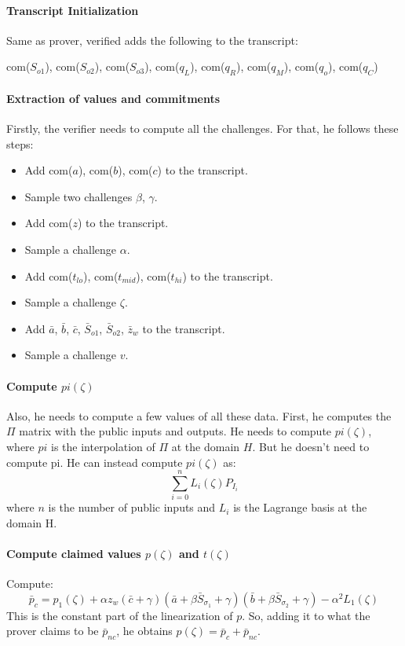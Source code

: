 \documentclass[../lecture-notes.tex]{subfiles}
\begin{document}
\paragraph{Transcript Initialization}

Same as prover, verified adds the following to the transcript:

\begin{center}
com($S_{o1}$), com($S_{o2}$), com($S_{o3}$), com($q_L$), com($q_R$), com($q_M$), com($q_o$), com($q_C$)
\end{center}

\paragraph{Extraction of values and commitments}

Firstly, the verifier needs to compute all the challenges. For that, he follows these steps:
\begin{itemize}
    \item Add com($a$), com($b$), com($c$) to the transcript.
    \item Sample two challenges $\beta$, $\gamma$.
    \item Add com($z$) to the transcript.
    \item Sample a challenge $\alpha$.
    \item Add com($t_{lo}$), com($t_{mid}$), com($t_{hi}$) to the transcript.
    \item Sample a challenge $\zeta$.
    \item Add $\bar{a}$, $\bar{b}$, $\bar{c}$, $\bar{S}_{o1}$, $\bar{S}_{o2}$, $\bar{z}_w$ to the transcript.
    \item Sample a challenge $v$.
\end{itemize}

\paragraph{Compute $pi(\zeta)$}
Also, he needs to compute a few values of all these data. First, he computes the $\Pi$ matrix with the public inputs and outputs. He needs to compute $pi(\zeta)$, where $pi$ is the interpolation of $\Pi$ at the domain $H$. But he doesn't need to compute pi. He can instead compute $pi(\zeta)$ as:
\[\sum_{i=0}^{n} L_{i}(\zeta) P_{I_i}\]
where $n$ is the number of public inputs and $L_i$ is the Lagrange basis at the domain H.

\paragraph{Compute claimed values $p(\zeta)$ and $t(\zeta)$}
Compute: 
\[\bar{p}_c = p_1(\zeta) + \alpha z_{w} \left( \bar{c} + \gamma \right) \left( \bar{a} + \beta \bar{S}_{\sigma_1} + \gamma \right) \left( \bar{b} + \beta \bar{S}_{\sigma_2} + \gamma \right) - \alpha^2 L_1(\zeta)\]
This is the constant part of the linearization of $p$. So, adding it to what the prover claims to be $\bar{p}_{nc}$, he obtains $p(\zeta) = \bar{p}_c + \bar{p}_{nc}$.
\end{document}
